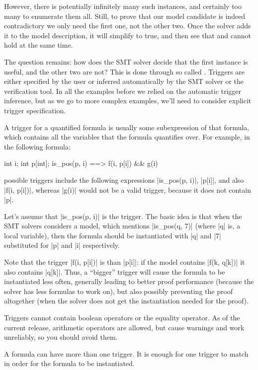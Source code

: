 However, there is potentially infinitely many such instances, and certainly too many
to enumerate them all.
Still, to prove that our model candidate is indeed contradictory
we only need the first one, not the other two.
Once the solver adds it to the model description,
it will simplify  to true,
and then see that  and  cannot hold
at the same time.

The question remains: how does the SMT solver decide that the first
instance is useful, and the other two are not?
This is done through so called .
Triggers are either specified by the user or inferred automatically
by the SMT solver or the verification tool.
In all the examples before we relied on the automatic trigger
inference, but as we go to more complex examples, we'll need to consider
explicit trigger specification.

A trigger for a quantified formula is usually some subexpression 
of that formula, which contains all the variables that the formula
quantifies over.
For example, in the following formula:
\begin{VCC}
\forall int i; int p[int]; is_pos(p, i) ==> f(i, p[i]) && g(i)
\end{VCC}
possible triggers include the following expressions
\vcc|is_pos(p, i)|, \vcc|p[i]|, and also \vcc|f(i, p[i])|,
whereas \vcc|g(i)| would not be a valid trigger, because
it does not contain \vcc|p|.

Let's assume that \vcc|is_pos(p, i)| is the trigger. 
The basic idea is that when the SMT solvers considers a model,
which mentions \vcc|is_pos(q, 7)| (where \vcc|q| is, \eg a local variable), then the formula
should be instantiated with \vcc|q| and \vcc|7| substituted
for \vcc|p| and \vcc|i| respectively.

Note that the trigger \vcc|f(i, p[i])| is  than
\vcc|p[i]|: if the model contains \vcc|f(k, q[k])| it also contains \vcc|q[k]|.
Thus, a ``bigger'' trigger will cause the formula to be instantiated less often,
generally leading to better proof performance (because the solver has
less formulas to work on), but also possibly preventing
the proof altogether (when the solver does not get the instantiation needed for the proof).

Triggers cannot contain boolean operators or the equality operator.
As of the current release, arithmetic operators are allowed, but cause warnings
and work unreliably, so you should avoid them.

A formula can have more than one trigger.
It is enough for one trigger to match in order for the formula
to be instantiated.

